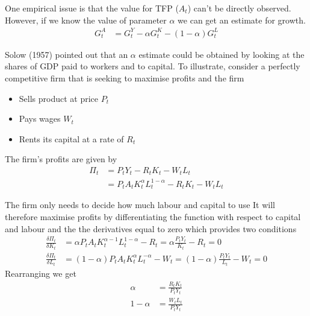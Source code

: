 \documentclass{beamer}
\begin{document}
\begin{frame}
One empirical issue is that the value for TFP ($A_t$) can't be directly observed. 
However, if we know the value of parameter $\alpha$ we can get an estimate for growth. 
\begin{align}
  G_t ^A &=G_t^Y -\alpha G_t^K - (1-\alpha)G_t^L
\end{align}
\end{frame}

\begin{frame}
  Solow (1957) pointed out that an $\alpha$ estimate could be obtained by looking at the shares of GDP paid to workers and to capital. 
  To illustrate, consider a perfectly competitive firm that is seeking to maximise profits and the firm
  \begin{itemize}
    \item Sells product at price $P_t$
    \item Pays wages $W_t$
    \item Rents its capital at a rate of $R_t$
  \end{itemize}
\end{frame}

\begin{frame}
  The firm's profits are given by
  \begin{align}
    \Pi_t &= P_tY_t - R_tK_t -W_tL_t\\
    &= P_tA_tK_t^{\alpha}L_t^{1-\alpha}-R_tK_t - W_tL_t  
  \end{align}
\end{frame}

\begin{frame}
  The firm only needs to decide how much labour and capital to use
  It will therefore maximise profits by differentiating the function with respect to capital and labour and the the derivatives equal to zero which provides two conditions
\begin{align}
  \frac{\delta \Pi_t}{\delta K_t} &= \alpha P_tA_tK_t^{\alpha-1}L_t^{1-\alpha} -R_t = \alpha \frac{P_tY_t}{K_t} - R_t = 0\\
  \frac{\delta \Pi_t}{\delta L_t} &= (1-\alpha) P_tA_tK_t^{\alpha}L_t^{-\alpha} - W_t = (1-\alpha) \frac{P_tY_t}{L_t}- W_t = 0
\end{align}
Rearranging we get
\begin{align}
  \alpha &= \frac{R_tK_t}{P_tY_t}\\
  1-\alpha &= \frac{W_tL_t}{P_tY_t}
\end{align}
\end{frame}
\end{document}
